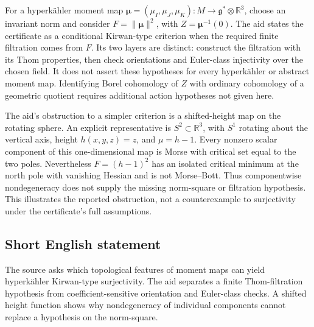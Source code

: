 \documentclass[11pt]{article}
\newcommand{\R}{\mathbb{R}}
\begin{document}
For a hyperkähler moment map \(\boldsymbol\mu=(\mu_I,\mu_J,\mu_K):M\to\mathfrak g^*\otimes\R^3\), choose an invariant norm and consider \(F=\|\boldsymbol\mu\|^2\), with \(Z=\boldsymbol\mu^{-1}(0)\). The aid states the certificate as a conditional Kirwan-type criterion when the required finite filtration comes from \(F\). Its two layers are distinct: construct the filtration with its Thom properties, then check orientations and Euler-class injectivity over the chosen field. It does not assert these hypotheses for every hyperkähler or abstract moment map. Identifying Borel cohomology of \(Z\) with ordinary cohomology of a geometric quotient requires additional action hypotheses not given here.

The aid's obstruction to a simpler criterion is a shifted-height map on the rotating sphere. An explicit representative is \(S^2\subset\R^3\), with \(S^1\) rotating about the vertical axis, height \(h(x,y,z)=z\), and \(\mu=h-1\). Every nonzero scalar component of this one-dimensional map is Morse with critical set equal to the two poles. Nevertheless \(F=(h-1)^2\) has an isolated critical minimum at the north pole with vanishing Hessian and is not Morse--Bott. Thus componentwise nondegeneracy does not supply the missing norm-square or filtration hypothesis. This illustrates the reported obstruction, not a counterexample to surjectivity under the certificate's full assumptions.
\subsection{Short English statement}
The source asks which topological features of moment maps can yield hyperkähler Kirwan-type surjectivity. The aid separates a finite Thom-filtration hypothesis from coefficient-sensitive orientation and Euler-class checks. A shifted height function shows why nondegeneracy of individual components cannot replace a hypothesis on the norm-square.
\end{document}
